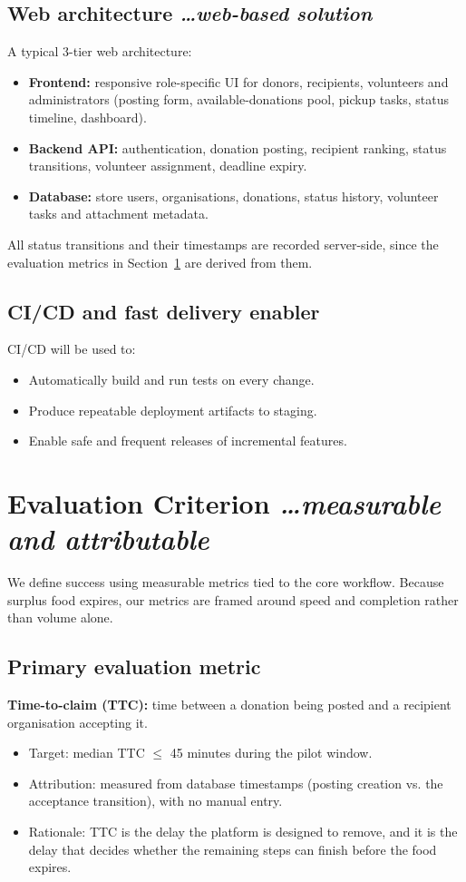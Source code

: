 \documentclass[11pt,a4paper]{article}
\newcommand{\BvrHint}[1]{%
  {\normalfont\normalsize\itshape\hfill #1}}
\begin{document}
\subsection{Web architecture %
\BvrHint{\ldots web-based solution}}
A typical 3-tier web architecture:
\begin{itemize}[leftmargin=0.7cm]
    \item \textbf{Frontend:} responsive role-specific UI for donors, recipients, volunteers and administrators (posting form, available-donations pool, pickup tasks, status timeline, dashboard).
    \item \textbf{Backend API:} authentication, donation posting, recipient ranking, status transitions, volunteer assignment, deadline expiry.
    \item \textbf{Database:} store users, organisations, donations, status history, volunteer tasks and attachment metadata.
\end{itemize}
All status transitions and their timestamps are recorded server-side, since the evaluation metrics in Section~\ref{sec:eval} are derived from them.

\subsection{CI/CD and fast delivery enabler}
CI/CD will be used to:
\begin{itemize}[leftmargin=0.7cm]
    \item Automatically build and run tests on every change.
    \item Produce repeatable deployment artifacts to staging.
    \item Enable safe and frequent releases of incremental features.
\end{itemize}

\section{Evaluation Criterion %
\BvrHint{\ldots measurable and attributable}}
\label{sec:eval}
We define success using measurable metrics tied to the core workflow. Because surplus food expires, our metrics are framed around speed and completion rather than volume alone.

\subsection{Primary evaluation metric}
\textbf{Time-to-claim (TTC):} time between a donation being posted and a recipient organisation accepting it.
\begin{itemize}[leftmargin=0.7cm]
    \item Target: median TTC $\le$ 45 minutes during the pilot window.
    \item Attribution: measured from database timestamps (posting creation vs. the acceptance transition), with no manual entry.
    \item Rationale: TTC is the delay the platform is designed to remove, and it is the delay that decides whether the remaining steps can finish before the food expires.
\end{itemize}
\end{document}
